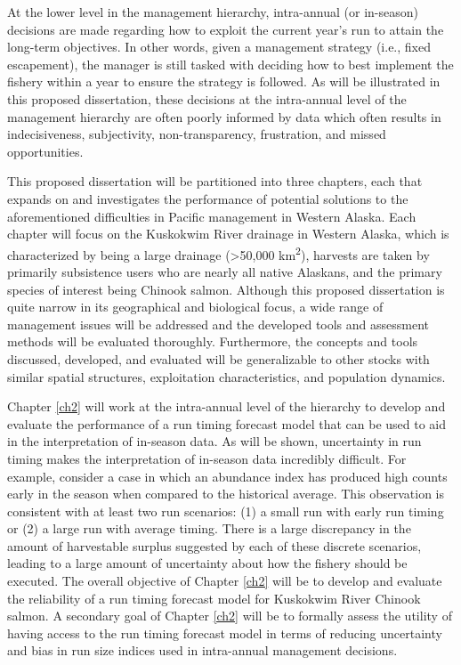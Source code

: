 \documentclass[12pt,]{book}
\theoremstyle{definition}
\theoremstyle{definition}
\theoremstyle{definition}
\theoremstyle{remark}
\begin{document}
At the lower level in the management hierarchy, intra-annual (or
in-season) decisions are made regarding how to exploit the current
year's run to attain the long-term objectives. In other words, given a
management strategy (i.e., fixed escapement), the manager is still
tasked with deciding how to best implement the fishery within a year to
ensure the strategy is followed. As will be illustrated in this proposed
dissertation, these decisions at the intra-annual level of the
management hierarchy are often poorly informed by data which often
results in indecisiveness, subjectivity, non-transparency, frustration,
and missed opportunities.

This proposed dissertation will be partitioned into three chapters, each
that expands on and investigates the performance of potential solutions
to the aforementioned difficulties in Pacific management in Western
Alaska. Each chapter will focus on the Kuskokwim River drainage in
Western Alaska, which is characterized by being a large drainage
(\textgreater{}50,000 km\textsuperscript{2}), harvests are taken by
primarily subsistence users who are nearly all native Alaskans, and the
primary species of interest being Chinook salmon. Although this proposed
dissertation is quite narrow in its geographical and biological focus, a
wide range of management issues will be addressed and the developed
tools and assessment methods will be evaluated thoroughly. Furthermore,
the concepts and tools discussed, developed, and evaluated will be
generalizable to other stocks with similar spatial structures,
exploitation characteristics, and population dynamics.

Chapter \ref{ch2} will work at the intra-annual level of the hierarchy
to develop and evaluate the performance of a run timing forecast model
that can be used to aid in the interpretation of in-season data. As will
be shown, uncertainty in run timing makes the interpretation of
in-season data incredibly difficult. For example, consider a case in
which an abundance index has produced high counts early in the season
when compared to the historical average. This observation is consistent
with at least two run scenarios: (1) a small run with early run timing
or (2) a large run with average timing. There is a large discrepancy in
the amount of harvestable surplus suggested by each of these discrete
scenarios, leading to a large amount of uncertainty about how the
fishery should be executed. The overall objective of Chapter \ref{ch2}
will be to develop and evaluate the reliability of a run timing forecast
model for Kuskokwim River Chinook salmon. A secondary goal of Chapter
\ref{ch2} will be to formally assess the utility of having access to the
run timing forecast model in terms of reducing uncertainty and bias in
run size indices used in intra-annual management decisions.
\end{document}
